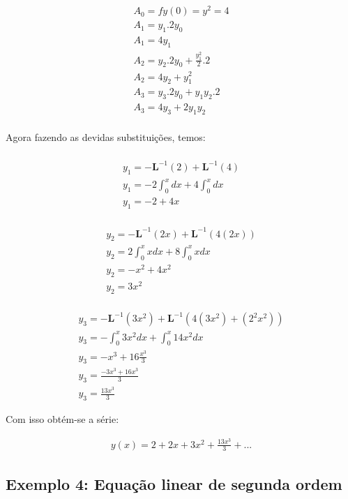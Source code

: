 \begin{gather*}
A_{0} = fy(0) = y^2 = 4\nonumber\\
A_{1} = y_{1}.2y_{0}\nonumber\\
A_{1} = 4y_{1}\nonumber\\
A_{2} = y_{2}.2y_{0} + \frac {y_{1}^{2}}{2}.2 \nonumber\\
A_{2} = 4y_{2} + y_{1}^2\nonumber\\
A_{3} = y_{3}.2y_{0}+y_{1}y_{2}.2\nonumber\\
A_{3} = 4y_{3} + 2y_{1}y_{2}\nonumber\\
\end{gather*}

Agora fazendo as devidas substituições, temos:

\begin{gather*}\nonumber\\
y_{1} = -\textbf{L}^{-1} (2) + \textbf{L}^{-1}(4)\nonumber\\
  y_{1} = -2\int_0^{x}dx + 4\int_0^{x}dx  \nonumber\\
  y_{1} = -2 + 4x
\end{gather*}

\begin{gather*}\nonumber\\
y_{2} = -\textbf{L}^{-1} (2x) + \textbf{L}^{-1}(4(2x))\nonumber\\
  y_{2} = 2\int_0^{x}xdx + 8\int_0^{x}xdx  \nonumber\\
  y_{2} = -x^2 + 4x^2\nonumber\\
  y_{2} = 3x^2\nonumber\\
\end{gather*}


\begin{gather*}
y_{3} = -\textbf{L}^{-1} (3x^2) + \textbf{L}^{-1}(4(3x^2) + (2^2x^2))\\
  y_{3} = -\int_0^{x}3x^2dx + \int_0^{x}14x^2dx  \\
  y_{3} = -x^3 + 16\frac{x^{3}}{3}\\
  y_{3} = \frac{-3x^{3} + 16x^3}{3}\\
   y_{3} = \frac{13x^{3}}{3}
\end{gather*}

Com isso obtém-se a série:

\begin{gather*}
  y(x) = 2 + 2x + 3x^2 + \frac{13x^{3}}{3} + ... 
\end{gather*}


\subsection{Exemplo 4: Equação linear de segunda ordem}

